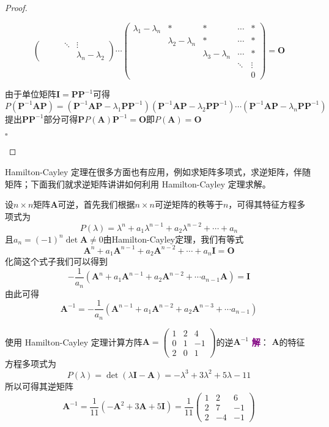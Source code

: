 \begin{proof}
\begin{tiny}
$$\begin{pmatrix}
  &  &  & \ddots & \vdots \\ 
  &  &  &  & \lambda_n-\lambda_2
\end{pmatrix}\cdots\begin{pmatrix}
  \lambda_1-\lambda_n & * & * & \cdots & *\\
  & \lambda_2-\lambda_n & * & \cdots & *\\
  &  & \lambda_3-\lambda_n & \cdots & *\\
  &  &  & \ddots & \vdots \\ 
  &  &  &  & 0
\end{pmatrix}=\mathbf{O}$$
\end{tiny}由于单位矩阵$\mathbf{I}=\mathbf{P}\mathbf{P}^{-1}$可得$$P(\mathbf{P}^{-1} \mathbf{A} \mathbf{P})=(\mathbf{P}^{-1} \mathbf{A} \mathbf{P} - \lambda_1\mathbf{P}\mathbf{P}^{-1})(\mathbf{P}^{-1} \mathbf{A} \mathbf{P} - \lambda_2\mathbf{P}\mathbf{P}^{-1}) \cdots (\mathbf{P}^{-1} \mathbf{A} \mathbf{P} - \lambda_n\mathbf{P}\mathbf{P}^{-1})$$提出$\mathbf{P}\mathbf{P}^{-1}$部分可得$\mathbf{P}P(\mathbf{A})\mathbf{P}^{-1}=\mathbf{O}$即$P(\mathbf{A})=\mathbf{O}$
\begin{flushright}
		$\square$
	\end{flushright}
\end{proof}

Hamilton-Cayley 定理在很多方面也有应用，例如求矩阵多项式，求逆矩阵，伴随矩阵；下面我们就求逆矩阵讲讲如何利用 Hamilton-Cayley 定理求解。

设$n\times n$矩阵$\mathbf{A}$可逆，首先我们根据$n\times n$可逆矩阵的秩等于$n$，可得其特征方程多项式为$$P(\lambda)=\lambda^n+a_1\lambda^{n-1}+a_2\lambda^{n-2}+\cdots+a_n$$且$a_n=(-1)^n \det \mathbf{A}\neq 0$由Hamilton-Cayley定理，我们有等式$$\mathbf{A}^n+a_1\mathbf{A}^{n-1}+a_2\mathbf{A}^{n-2}+\cdots+a_n\mathbf{I}=\mathbf{O}$$化简这个式子我们可以得到$$-\frac{1}{a_n}\left( \mathbf{A}^n+a_1\mathbf{A}^{n-1}+a_2\mathbf{A}^{n-2}+\cdots a_{n-1}\mathbf{A} \right)=\mathbf{I}$$由此可得$$\mathbf{A}^{-1}=-\frac{1}{a_n}\left( \mathbf{A}^{n-1}+a_1\mathbf{A}^{n-2}+a_2\mathbf{A}^{n-3}+\cdots a_{n-1}\right)$$

\begin{example}
	使用 Hamilton-Cayley 定理计算方阵$\mathbf{A}=\begin{pmatrix}
 1 & 2 & 4\\
 0 & 1 & -1\\
 2 & 0 & 1
\end{pmatrix}$的逆$\mathbf{A}^{-1}$
\tcblower
\textcolor{purple}{\textbf{解}}： $\mathbf{A}$的特征方程多项式为$$P(\lambda)=\det \left( \lambda\mathbf{I}-\mathbf{A} \right)=-\lambda^3+3\lambda^2+5\lambda-11$$所以可得其逆矩阵$$\mathbf{A}^{-1}=\frac{1}{11}\left( -\mathbf{A}^2+3\mathbf{A}+5\mathbf{I} \right)=\frac{1}{11}\begin{pmatrix}
 1 & 2 & 6\\
 2 & 7 & -1\\
 2 & -4 & -1
\end{pmatrix}$$
\end{example}


